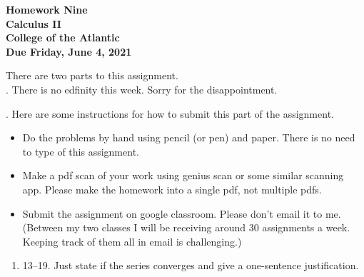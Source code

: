 \documentclass[12pt]{article}
\begin{document}
\pagestyle{empty}
 
\begin{center}
{\LARGE {\bf Homework Nine}}\\
\bigskip
{\Large {\bf Calculus II}}\\
\bigskip
{\Large {\bf College of the Atlantic}}\\
\bigskip
{ {\bf Due Friday, June 4, 2021}}\\ 
\end{center}
\medskip


\noindent There are two parts to this assignment.\\

. There is no edfinity this week.
Sorry for the disappointment. 

.  Here are some
instructions for how to submit this part of the assignment.
\begin{itemize}
  \setlength{\itemsep}{0mm}
\item Do the problems by hand using pencil (or pen) and paper.
  There is no need to type of this assignment.
\item Make a pdf scan of your work using genius scan or some
  similar scanning app.  Please make the homework into a single
  pdf, not multiple pdfs.
\item Submit the assignment on google classroom.  Please don't
  email it to me.  (Between my two classes I will be receiving
  around 30 assignments a week.  Keeping track of them all in email
  is challenging.)
\end{itemize}

\begin{enumerate}
  \setlength{\itemsep}{-1mm}
\item 13--19.  Just state if the series converges and give a
  one-sentence justification. 
\end{enumerate}
\end{document}
